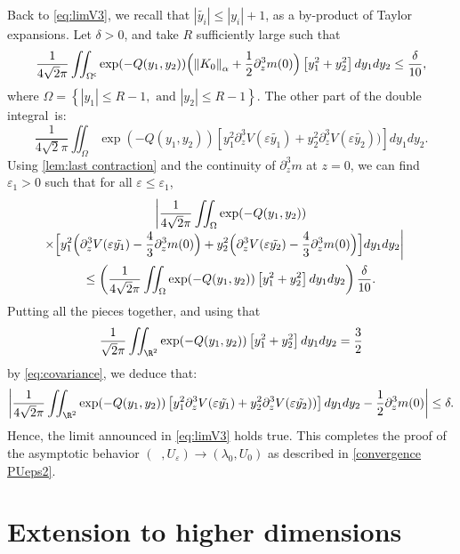 \documentclass[10pt]{amsart}
\theoremstyle{plain}
\theoremstyle{definition}
\newcommand{\comega}{\Omega^{\mathsf{c}}}
\let\eps\varepsilon
\newcommand{\abs}[1]{\left\lvert#1\right\rvert}
\newcommand{\nalph}[1]{\left\lVert#1\right\rVert_\alpha}
\DeclareMathOperator{\lep}{\lambda_\varepsilon}
\begin{document}
Back to \eqref{eq:limV3}, we recall that $\abs{\tilde{y_i}} \leq \abs{ y_i}+1$, as a by-product of Taylor expansions. Let $\delta>0$, and take $R$ sufficiently large such that
\begin{equation*}
\dfrac{1}{4\sqrt{2}\pi}\iint _{\comega} \exp(-Q (y_1,y_2)) \Bigl (\nalph{K_0} + \dfrac12 \partial_z^3m(0)\Bigr) \left[ y_1^2 + y_2^2 \right] dy_1dy_2
\leq \frac\delta{10},
\end{equation*}
where $\Omega = \left\{ \abs{y_1} \leq R - 1, \text{ and } \abs{y_2} \leq R - 1 \right\}$. The other part of the double integral~is:
\begin{equation*}
\dfrac{1}{4\sqrt{2}\pi}\iint _{\Omega} \exp(-Q (y_1,y_2)) \left[ y_1^2 \partial_z^3 V(\eps \tilde{y_1}) + y_2^2 \partial_z^3 V(\eps \tilde{y_2})) \right] dy_1dy_2.
\end{equation*}
Using \cref{lem:last contraction} and the continuity of $\partial_z^3m$ at $z = 0$, we can find $\eps_1>0$ such that for all $\eps\leq \eps_1$,
\begin{multline*}
\biggl|\dfrac{1}{4\sqrt{2}\pi}\iint _{\Omega} \exp(-Q (y_1,y_2))\\[-3pt]
\shoveright{\times\Bigl[ y_1^2 \Bigl (\partial_z^3 V(\eps \tilde{y_1})- \dfrac43 \partial_z^3m(0)\Bigr) + y_2^2 \Bigl (\partial_z^3 V(\eps \tilde{y_2})- \dfrac43 \partial_z^3m(0)\Bigr) \Bigr] dy_1dy_2 \biggr|}\\
\leq \left (\dfrac{1}{4\sqrt{2}\pi}\iint _{\Omega} \exp(-Q (y_1,y_2)) \left[ y_1^2 + y_2^2 \right] dy_1dy_2\right) \dfrac{\delta}{10}.
\end{multline*}
Putting all the pieces together, and using that $$\frac1{\sqrt{2}\pi} \iint_{\R^2} \exp(-Q (y_1,y_2)) \left[ y_1^2 + y_2^2 \right] dy_1dy_2 = \frac32$$ by \eqref{eq:covariance}, we deduce that:
\begin{equation*}
\abs{\dfrac{1}{4\sqrt{2}\pi} \iint _{\R^2} \exp(-Q (y_1,y_2)) \left[ y_1^2 \partial_z^3 V(\eps \tilde{y_1}) + y_2^2 \partial_z^3 V(\eps \tilde{y_2})) \right] dy_1dy_2 - \dfrac12 \partial_z^3m(0)} \leq \delta.
\end{equation*}
Hence, the limit announced in \eqref{eq:limV3} holds true. This completes the proof of the asymp\-totic behavior $(\lep, U_\eps)\to (\lambda_0,U_0)$ as described in \eqref{convergence PUeps2}.

\section{Extension to higher dimensions}\label{sec large dim}
\end{document}
